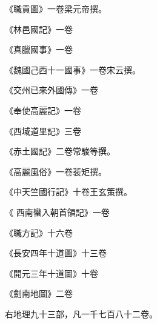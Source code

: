 \begin{pinyinscope}
 《職貢圖》一卷梁元帝撰。



 《林邑國記》一卷



 《真臘國事》一卷



 《魏國己西十一國事》一卷宋云撰。



 《交州已來外國傳》一卷



 《奉使高麗記》一卷



 《西域道里記》三卷



 《赤土國記》二卷常駿等撰。



 《高麗風俗》一卷裴矩撰。



 《中天竺國行記》十卷王玄策撰。



 《
 西南蠻入朝首領記》一卷



 《職方記》十六卷



 《長安四年十道圖》十三卷



 《開元三年十道圖》十卷



 《劍南地圖》二卷



 右地理九十三部，凡一千七百八十二卷。



\end{pinyinscope}